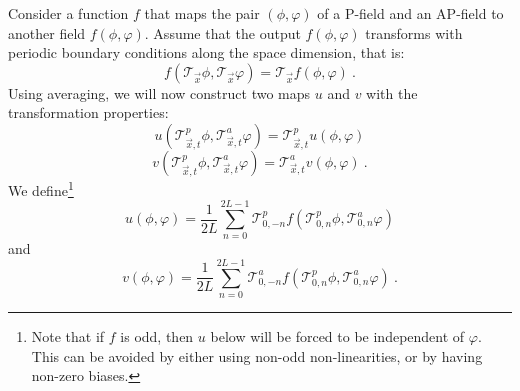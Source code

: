\documentclass[aps,prd,twocolumn,nofootinbib,superscriptaddress,preprintnumbers]{revtex4-1}
\begin{document}
Consider a function $f$ that maps the pair $(\phi, \varphi)$ of a P-field and an AP-field to another field $f(\phi, \varphi)$. Assume that the output $f(\phi, \varphi)$ transforms with periodic boundary conditions along the space dimension, that is:
%
\begin{equation}\label{eq:f-equivariance}
    f(\mathcal{T}_{\vec{x}} \phi, \mathcal{T}_{\vec{x}} \varphi) = \mathcal{T}_{\vec{x}} f(\phi, \varphi)\ .
\end{equation}
%
Using averaging, we will now construct two maps $u$ and $v$ with the transformation properties:
%
\begin{equation}\label{eq:s-equivariance-prop}
    u(\mathcal{T}^p_{\vec{x}, t}\phi, \mathcal{T}^a_{\vec{x}, t}\varphi) = \mathcal{T}^p_{\vec{x}, t}u(\phi, \varphi)
\end{equation}
%
\begin{equation}\label{eq:t-equivariance-prop}
    v(\mathcal{T}^p_{\vec{x}, t}\phi, \mathcal{T}^a_{\vec{x}, t}\varphi) = \mathcal{T}^a_{\vec{x}, t}v(\phi, \varphi) \ .
\end{equation}
%
We define\footnote{Note that if $f$ is odd, then $u$ below will be forced to be independent of $\varphi$. This can be avoided by either using non-odd non-linearities, or by having non-zero biases.}
%
\begin{equation}
    u(\phi, \varphi) = \frac{1}{2L}\sum_{n=0}^{2L-1}\mathcal{T}^p_{0,-n}f(\mathcal{T}^p_{0,n}\phi, \mathcal{T}^a_{0,n}\varphi)
\end{equation}
%
and
%
\begin{equation}
    v(\phi, \varphi) = \frac{1}{2L}\sum_{n=0}^{2L-1}\mathcal{T}^a_{0,-n}f(\mathcal{T}^p_{0,n}\phi, \mathcal{T}^a_{0,n}\varphi) \ .
\end{equation}
\end{document}
